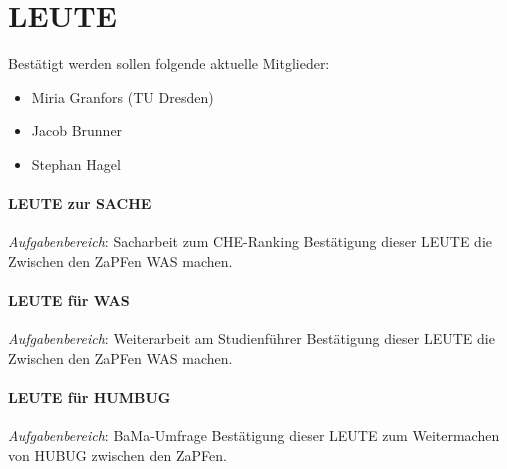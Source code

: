   \section{LEUTE}
    Bestätigt werden sollen folgende aktuelle Mitglieder:
    \begin{itemize}
      \item Miria Granfors (TU Dresden)
      \item Jacob Brunner
      \item Stephan Hagel
    \end{itemize}

    \paragraph{LEUTE zur SACHE}
      \textit{Aufgabenbereich}: Sacharbeit zum CHE-Ranking
      Bestätigung dieser LEUTE die Zwischen den ZaPFen WAS machen.

    \paragraph{LEUTE für WAS}
      \textit{Aufgabenbereich}: Weiterarbeit am Studienführer
      Bestätigung dieser LEUTE die Zwischen den ZaPFen WAS machen.

    \paragraph{LEUTE für HUMBUG}
      \textit{Aufgabenbereich}: BaMa-Umfrage
      Bestätigung dieser LEUTE zum Weitermachen von HUBUG zwischen den ZaPFen.
